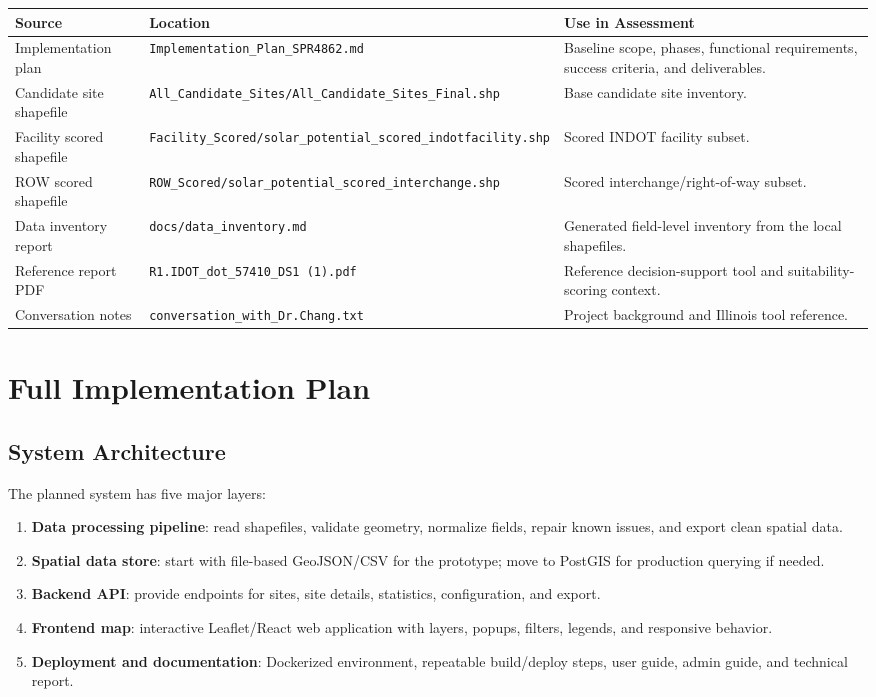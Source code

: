 \documentclass[11pt]{article}
\newcommand{\code}[1]{\nolinkurl{#1}}
\begin{document}
\begin{longtable}{L{0.32\textwidth} L{0.28\textwidth} L{0.32\textwidth}}
\toprule
\textbf{Source} & \textbf{Location} & \textbf{Use in Assessment} \\
\midrule
\endhead
Implementation plan & \code{Implementation_Plan_SPR4862.md} & Baseline scope, phases, functional requirements, success criteria, and deliverables. \\
Candidate site shapefile & \code{All_Candidate_Sites/All_Candidate_Sites_Final.shp} & Base candidate site inventory. \\
Facility scored shapefile & \code{Facility_Scored/solar_potential_scored_indotfacility.shp} & Scored INDOT facility subset. \\
ROW scored shapefile & \code{ROW_Scored/solar_potential_scored_interchange.shp} & Scored interchange/right-of-way subset. \\
Data inventory report & \code{docs/data_inventory.md} & Generated field-level inventory from the local shapefiles. \\
Reference report PDF & \code{R1.IDOT_dot_57410_DS1 (1).pdf} & Reference decision-support tool and suitability-scoring context. \\
Conversation notes & \code{conversation_with_Dr.Chang.txt} & Project background and Illinois tool reference. \\
\bottomrule
\end{longtable}

\section{Full Implementation Plan}

\subsection{System Architecture}

The planned system has five major layers:

\begin{enumerate}
  \item \textbf{Data processing pipeline}: read shapefiles, validate geometry, normalize fields, repair known issues, and export clean spatial data.
  \item \textbf{Spatial data store}: start with file-based GeoJSON/CSV for the prototype; move to PostGIS for production querying if needed.
  \item \textbf{Backend API}: provide endpoints for sites, site details, statistics, configuration, and export.
  \item \textbf{Frontend map}: interactive Leaflet/React web application with layers, popups, filters, legends, and responsive behavior.
  \item \textbf{Deployment and documentation}: Dockerized environment, repeatable build/deploy steps, user guide, admin guide, and technical report.
\end{enumerate}
\end{document}
